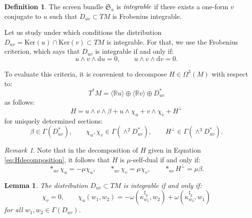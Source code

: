 \documentclass[10pt,a4paper,twoside,reqno]{amsart}
\theoremstyle{plain}
\newtheorem{lemma}[thm]{Lemma}
\theoremstyle{definition}
\newtheorem{definition}[thm]{Definition}
\theoremstyle{remark}
\newtheorem{remark}[thm]{Remark}
\def\R{\mathbb{R}}
\def\dd{\mathrm{d}}
\def\R{\mathbb{R}}
\def\dd{\mathrm{d}}
\newcommand{\escal}[1]{\langle#1\rangle}
\renewcommand{\ker}{\mathrm{Ker}}
\begin{document}
\begin{definition}
The screen bundle $\mathfrak{S}_u$ is $\emph{integrable}$ if there exists a one-form $v$ conjugate to $u$ such that $D_{uv}\subset TM$ is Frobenius integrable. 
\end{definition}

Let us study under which conditions the distribution $D_{uv}=\ker(u)\cap\ker(v)\subset TM$ is integrable. For that, we use the Frobenius criterion, which says that $D_{uv}$ is integrable if and only if:
\begin{equation*}
u\wedge v\wedge \dd u=0,\qquad u\wedge v\wedge\dd v=0.
\end{equation*}
 
\noindent
To evaluate this criteria, it is convenient to decompose $H\in\Omega^3(M)$ with respect to: $$T^*M=\escal{\R u}\oplus\escal{\R v}\oplus D^*_{uv}$$ as follows:
\begin{equation}
\label{eq:Hdecomposition}
H = u\wedge v\wedge\beta + u\wedge\chi_u + v\wedge\chi_v + H^\perp    
\end{equation}
for uniquely determined sections:
\begin{equation*}
\beta\in\Gamma(D_{uv}^*),\qquad \chi_u,\chi_v\in\Gamma(\wedge^2D_{uv}^*),\qquad H^\perp\in\Gamma(\wedge^3D_{uv}^*).    
\end{equation*}

\begin{remark}
Note that in the decomposition of $H$ given in Equation \eqref{eq:Hdecomposition}, it follows that $H$ is $\mu$-self-dual if and only if:
\begin{equation*}
*_{uv}\chi_u=-\mu\chi_u,\qquad *_{uv}\chi_v=\mu\chi_v,\qquad *_{uv}H^\perp=\mu\beta.
\end{equation*}
\end{remark}
 
\begin{lemma}\label{lemma:D_integrable}
The distribution $D_{uv}\subset TM$ is integrable if and only if: $$\chi_v=0,\qquad \chi_u(w_1,w_2)=-\omega(\kappa_{w_1}^{\sharp_g},w_2)+\omega(\kappa_{w_2}^{\sharp_g},w_1)$$ for all $w_1,w_2\in\Gamma(D_{uv})$.
\end{lemma}
\end{document}
